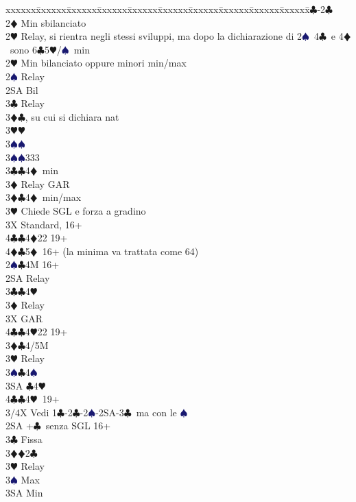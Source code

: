 \documentclass[a4paper,italian]{article}
\newcommand{\BC}{\textcolor{OliveGreen}{$\clubsuit$}}
\newcommand{\BD}{\textcolor{RedOrange}{$\vardiamondsuit$}}
\newcommand{\BH}{\textcolor{Red2}{$\varheartsuit${}}}
\newcommand{\BS}{\textcolor{MidnightBlue}{$\spadesuit${}}}
\newenvironment{bidtable}
{\begin{tabbing}

    xxxxxx\=xxxxxx\=xxxxxx\=xxxxxx\=xxxxxx\=xxxxxx\=xxxxxx\=xxxxxx\=xxxxxx\=xxxxxx\=\kill}
{\end{tabbing} }%
\begin{document}
\begin{bidtable}
    1\BC-2\BC\+\\
    2\BD \> Min sbilanciato\+\\
    2\BH \> Relay, si rientra negli stessi sviluppi, ma dopo la dichiarazione di 2\BS\ 4\BC\ e 4\BD\ sono 6\BC 5\BH /\BS\ min\-\\
    2\BH \> Min bilanciato oppure minori min/max\+\\
    2\BS \> Relay\+\\
    2SA \> Bil\+\\
    3\BC \> Relay\+\\
    3\BD {}\BC , su cui si dichiara nat\\
    3\BH {}\BH \+\\
    3\BS {}\BS \-\\
    3\BS {}\BS 333\-\-\\
    3\BC {}\BC 4\BD\ min\+\\
    3\BD \> Relay GAR\-\\
    3\BD {}\BC 4\BD\ min/max\+\\
    3\BH \> Chiede SGL e forza a gradino\-\\
    3X \> Standard, 16+\\
    4\BC {}\BC 4\BD 22 19+\\
    4\BD {}\BC 5\BD\ 16+ (la minima va trattata come 64)\-\-\\
    2\BS {}\BC 4M 16+\+\\
    2SA \> Relay\+\\
    3\BC {}\BC 4\BH \+\\
    3\BD \> Relay\+\\
    3X \> GAR\\
    4\BC {}\BC 4\BH 22 19+\-\-\\
    3\BD {}\BC 4/5M\+\\
    3\BH \> Relay\+\\
    3\BS {}\BC 4\BS \\
    3SA \BC 4\BH \\
    4\BC {}\BC 4\BH\ 19+\-\-\\
    3/4X \> Vedi 1\BC -2\BC -2\BS -2SA-3\BC\ ma con le \BS \-\-\\
    2SA +\BC\ senza SGL 16+\+\\
    3\BC \> Fissa\\
    3\BD {}\BD 2\BC \\
    3\BH \> Relay\+\\
    3\BS \> Max\\
    3SA \> Min\-\-\\

\end{bidtable}
\end{document}
